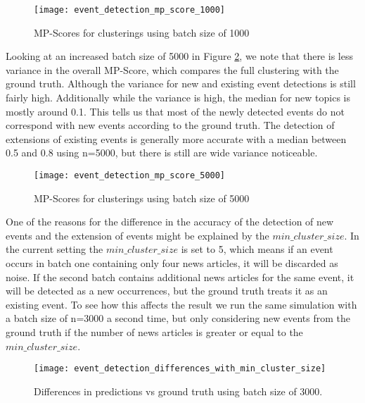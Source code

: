 \begin{figure}[h]
    \centering
    \texttt{[image: event\_detection\_mp\_score\_1000]}
    \caption{MP-Scores for clusterings using batch size of 1000}
    \label{fig:event_detection_mp_score_1000}
\end{figure}

Looking at an increased batch size of 5000 in Figure \ref{fig:event_detection_mp_score_5000}, we note that there is less variance in the overall MP-Score, which compares the full clustering with the ground truth. Although the variance for new and existing event detections is still fairly high. Additionally while the variance is high, the median for new topics is mostly around 0.1. This tells us that most of the newly detected events do not correspond with new events according to the ground truth. The detection of extensions of existing events is generally more accurate with a median between 0.5 and 0.8 using n=5000, but there is still are wide variance noticeable.

\begin{figure}[h]
    \centering
    \texttt{[image: event\_detection\_mp\_score\_5000]}
    \caption{MP-Scores for clusterings using batch size of 5000}
    \label{fig:event_detection_mp_score_5000}
\end{figure}

One of the reasons for the difference in the accuracy of the detection of new events and the extension of events might be explained by the $min\_cluster\_size$. In the current setting the $min\_cluster\_size$ is set to 5, which means if an event occurs in batch one containing only four news articles, it will be discarded as noise. If the second batch contains additional news articles for the same event, it will be detected as a new occurrences, but the ground truth treats it as an existing event. To see how this affects the result we run the same simulation with a batch size of n=3000 a second time, but only considering new events from the ground truth if the number of news articles is greater or equal to the $min\_cluster\_size$.

\begin{figure}[h]
    \centering
    \texttt{[image: event\_detection\_differences\_with\_min\_cluster\_size]}
    \caption{Differences in predictions vs ground truth using batch size of 3000.}
    \label{fig:event_detection_differences_with_min_cluster_size}
\end{figure}

